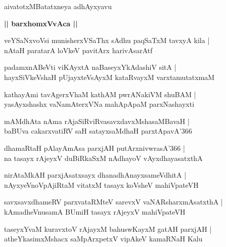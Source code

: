 \documentclass[twoside,12pt,openright]{book}
\newcounter{shloka}[chapter]
\def\uvaca#1{\centerline{{\large\textbf{#1}}}}
\begin{document}
\begin{center}
aivatotxMBatatxneya adhAyxyavu
\end{center}

\uvaca{|| barxhomxVvAca ||}

\begin{shloka}%
veYSaNxvoVsi munisherxVSaThx sAdhu paqSaTxM tavxyA kila |\\
nAtaH paratarA loVkeV pavitArx harivAsarAtf 
\end{shloka}

\begin{shloka}%
padamxnABeVti viKAyxtA naBaseyxYkAdashiV sitA |\\
hayxSiVkeVshaH pUjayxteVsAyxM kataRvayxM varxtamutatxmaM
\end{shloka}

\begin{shloka}%
kathayAmi tavAgerxVhaM kathAM pwrANakiVM shuBAM |\\
yasAyxshashx vaNamAterxVNa mahApApaM parxNashayxti 
\end{shloka}

\begin{shloka}%
mAMdhAta nAma rAjaSiRviRvasavxdavxMshasaMBavaH |\\
baBUva cakarxvatiRV saH satayxsaMdhaH parxtApavA\char'366
\end{shloka}

\begin{shloka}%
dhamaRtaH pAlayAmAsa parxjAH putArxnivwrasA\char'366 |\\
na tasayx rAjeyxV duBiRkaSxM nAdhayoV vAyxdhayasatxthA
\end{shloka}

\begin{shloka}%
nirAtaMkAH parxjAsatxsayx dhanadhAnayxsameVdhitA |\\
nAyxyeVnoVpAjiRtaM vitatxM tasayx koVsheV mahiVpateVH
\end{shloka}

\begin{shloka}%
savxsavxdhameRV parxvataRMteV sarevxV vaNARsharxmAsatxthA |\\
kAmadheVnusamA BUmiH tasayx rAjeyxV mahiVpateVH
\end{shloka}

\begin{shloka}%
taseyxYvaM kuravxtoV rAjayxM bahuswKayxM gatAH parxjAH |\\
atheYkasimxMshacx saMpArxpetxV vipAkeV kamaRNaH Kalu
\end{shloka}
\end{document}
